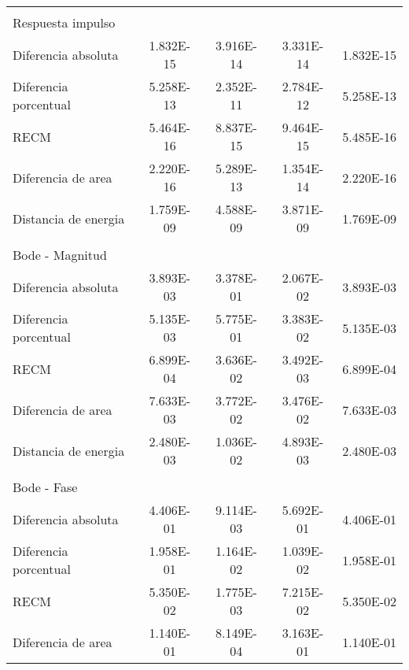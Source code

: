 {\begin{longtable}{l @{\extracolsep{\fill}} cccc}
            & & & &\\
            Respuesta impulso & & & & \\ \cmidrule{1-1}
            Diferencia absoluta          & \num{1.832E-15} & \num{3.916E-14} & \num{3.331E-14} & \num{1.832E-15}  \\
            Diferencia porcentual        & \num{5.258E-13} & \num{2.352E-11} & \num{2.784E-12} & \num{5.258E-13}  \\
            RECM                         & \num{5.464E-16} & \num{8.837E-15} & \num{9.464E-15} & \num{5.485E-16}  \\
            Diferencia de area           & \num{2.220E-16} & \num{5.289E-13} & \num{1.354E-14} & \num{2.220E-16}  \\
            Distancia de energia         & \num{1.759E-09} & \num{4.588E-09} & \num{3.871E-09} & \num{1.769E-09}  \\
            & & & &\\
            Bode - Magnitud  & & & & \\ \cmidrule{1-1}
            Diferencia absoluta          & \num{3.893E-03} & \num{3.378E-01} & \num{2.067E-02} & \num{3.893E-03}  \\
            Diferencia porcentual        & \num{5.135E-03} & \num{5.775E-01} & \num{3.383E-02} & \num{5.135E-03}  \\
            RECM                         & \num{6.899E-04} & \num{3.636E-02} & \num{3.492E-03} & \num{6.899E-04}  \\
            Diferencia de area           & \num{7.633E-03} & \num{3.772E-02} & \num{3.476E-02} & \num{7.633E-03}  \\
            Distancia de energia         & \num{2.480E-03} & \num{1.036E-02} & \num{4.893E-03} & \num{2.480E-03}  \\
            & & & &\\
            Bode - Fase & & & &\\ \cmidrule{1-1}
            Diferencia absoluta          & \num{4.406E-01} & \num{9.114E-03} & \num{5.692E-01} & \num{4.406E-01}  \\
            Diferencia porcentual        & \num{1.958E-01} & \num{1.164E-02} & \num{1.039E-02} & \num{1.958E-01}  \\
            RECM                         & \num{5.350E-02} & \num{1.775E-03} & \num{7.215E-02} & \num{5.350E-02}  \\
            Diferencia de area           & \num{1.140E-01} & \num{8.149E-04} & \num{3.163E-01} & \num{1.140E-01}  \\

\end{longtable}}
